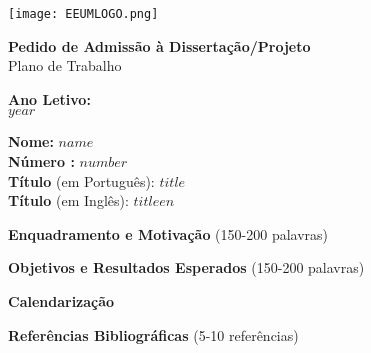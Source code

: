 \documentclass[a4paper, 12pt]{article}
\begin{document}
   
\begin{textbox}[halign=center, valign=center, fit to height=3cm, width=0.2\textwidth, after=, frame hidden, boxrule=-1pt]
    \begin{minipage}[t]{\linewidth}
    \vspace*{0pt}
        \texttt{[image: EEUMLOGO.png]}
    \end{minipage}
\end{textbox}
\negthickspace
\begin{textbox}[halign=center, valign=center, fit to height=3cm, width=0.8\textwidth, before=, frame hidden, boxrule=-1pt]
    \large\textbf{Pedido de Admissão à Dissertação/Projeto} \\
    Plano de Trabalho 
\end{textbox}
    
\begin{textbox}[halign=center, valign=center, fit to height=3cm, width=0.2\textwidth, after=]
    \textbf{Ano Letivo:} \\
    $year$
\end{textbox}
\negthickspace
\begin{textbox}[valign=center, fit to height=3cm, width=0.8\textwidth, before=]
    \small{\textbf{Nome:}} $name$ \\
    \small{\textbf{Número :}} $number$\\
    \textbf{Título} \small(em Português): $title$ \\
    \textbf{Título} \small(em Inglês): $titleen$
\end{textbox}


\begin{textbox}
\small{\textbf{Enquadramento e Motivação}} \tiny{(150-200 palavras)} \small

\end{textbox}

\begin{textbox}
\small{\textbf{Objetivos e Resultados Esperados}} \tiny{(150-200 palavras)} \small

\end{textbox}

\begin{textbox}
\small{\textbf{Calendarização}}\tiny{} \small

\end{textbox}

\begin{textbox}
\small{\textbf{Referências Bibliográficas}} \tiny{(5-10 referências)} \small

\end{textbox}
\end{document}
